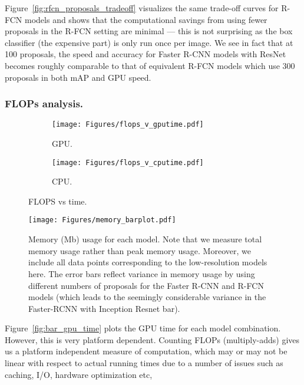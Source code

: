 \documentclass[10pt,twocolumn,letterpaper]{article}
\renewcommand{\paragraph}[1]{\subsubsection{#1}}
\begin{document}
Figure~\ref{fig:rfcn_proposals_tradeoff} visualizes the same trade-off
curves for R-FCN models and shows that the computational savings from
using fewer proposals in the R-FCN setting are minimal --- this is not
surprising as the box classifier (the expensive part) is only run once
per image.  We see in fact that at 100 proposals, the speed and
accuracy for Faster R-CNN models with ResNet becomes roughly
comparable to that of equivalent R-FCN models which use 300 proposals
in both mAP and GPU speed. 

\paragraph{FLOPs analysis.}\vspace{-3mm}

\begin{figure*}[t!]
{\footnotesize 
  \begin{center}
    \begin{subfigure}[t]{0.48\linewidth}
\texttt{[image: Figures/flops\_v\_gputime.pdf]}
\caption{GPU.}
\label{fig:flops_v_gputime}
    \end{subfigure}
        \begin{subfigure}[t]{0.48\linewidth}
\texttt{[image: Figures/flops\_v\_cputime.pdf]}
\caption{CPU.}
\label{fig:flops_v_cputime}
\end{subfigure}\vspace{-5mm}
  \end{center}
  \caption{\footnotesize FLOPS vs time.}
  \label{fig:flops}
  }
\end{figure*}


\begin{figure*}[t!]
\begin{center}
\texttt{[image: Figures/memory\_barplot.pdf]}
\caption{
\footnotesize Memory (Mb) usage for each model.  Note that we measure total memory usage
rather than peak memory usage.  Moreover, we include all data points
corresponding to the low-resolution models here.  The error bars
reflect 
variance in memory usage by using different numbers of proposals for
the Faster R-CNN and R-FCN models (which leads to the seemingly 
considerable variance in the Faster-RCNN with Inception Resnet bar).
}
\label{fig:memory_barplot}
\end{center}
\end{figure*}

Figure~\ref{fig:bar_gpu_time} plots the GPU time for each model
combination.
However, this is very platform dependent.
Counting FLOPs (multiply-adds)
gives us a platform independent measure of computation,
which may or may not be linear with respect to actual running times
due to a number of issues such as caching, I/O, hardware optimization etc,  
\end{document}
